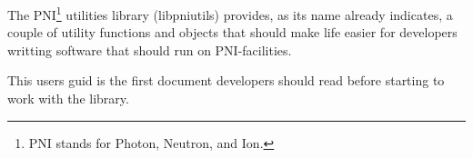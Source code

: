 

The PNI\footnote{PNI stands for Photon, Neutron, and Ion.} utilities library
(libpniutils) provides, as its name already indicates, a couple of utility 
functions and objects that should make  life easier for developers writting 
software that should run on PNI-facilities.

This users guid is the first document developers should read before starting 
to work with the library.  